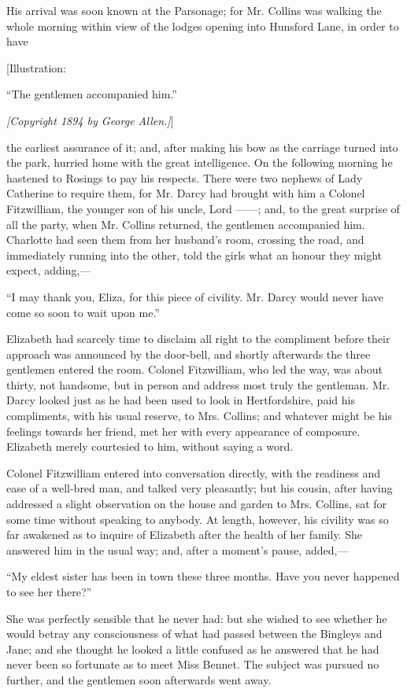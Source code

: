 \documentclass[12pt]{book}
\begin{document}
His arrival was soon known at the Parsonage; for Mr. Collins was walking the whole morning within view of the lodges opening into Hunsford Lane, in order to have

[Illustration:

``The gentlemen accompanied him.''

\emph{[\textit{Copyright 1894 by George Allen.}]}]

the earliest assurance of it; and, after making his bow as the carriage turned into the park, hurried home with the great intelligence. On the following morning he hastened to Rosings to pay his respects. There were two nephews of Lady Catherine to require them, for Mr. Darcy had brought with him a Colonel Fitzwilliam, the younger son of his uncle, Lord ------; and, to the great surprise of all the party, when Mr. Collins returned, the gentlemen accompanied him. Charlotte had seen them from her husband's room, crossing the road, and immediately running into the other, told the girls what an honour they might expect, adding,---

``I may thank you, Eliza, for this piece of civility. Mr. Darcy would never have come so soon to wait upon me.''

Elizabeth had scarcely time to disclaim all right to the compliment before their approach was announced by the door-bell, and shortly afterwards the three gentlemen entered the room. Colonel Fitzwilliam, who led the way, was about thirty, not handsome, but in person and address most truly the gentleman. Mr. Darcy looked just as he had been used to look in Hertfordshire, paid his compliments, with his usual reserve, to Mrs. Collins; and whatever might be his feelings towards her friend, met her with every appearance of composure. Elizabeth merely courtesied to him, without saying a word.

Colonel Fitzwilliam entered into conversation directly, with the readiness and ease of a well-bred man, and talked very pleasantly; but his cousin, after having addressed a slight observation on the house and garden to Mrs. Collins, sat for some time without speaking to anybody. At length, however, his civility was so far awakened as to inquire of Elizabeth after the health of her family. She answered him in the usual way; and, after a moment's pause, added,---

``My eldest sister has been in town these three months. Have you never happened to see her there?''

She was perfectly sensible that he never had: but she wished to see whether he would betray any consciousness of what had passed between the Bingleys and Jane; and she thought he looked a little confused as he answered that he had never been so fortunate as to meet Miss Bennet. The subject was pursued no further, and the gentlemen soon afterwards went away.
\end{document}
